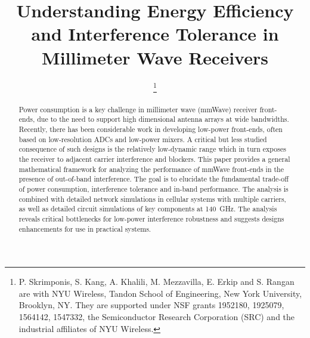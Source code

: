 \documentclass[conference]{IEEEtran}
\begin{document}
\title{Understanding Energy Efficiency and 
Interference Tolerance 
in Millimeter Wave Receivers}



\author{
    
    
    
    \thanks{P. Skrimponis, S. Kang, A. Khalili, M. Mezzavilla, E. Erkip and S. Rangan are with NYU Wireless, Tandon School of Engineering, New York University, Brooklyn, NY.
    They are supported under
    NSF grants 1952180, 1925079, 1564142, 
    1547332, the Semiconductor Research Corporation (SRC) and the industrial affiliates
    of NYU Wireless.
    }
    

}
\IEEEoverridecommandlockouts

\maketitle

\begin{abstract}
Power consumption is a key challenge
in millimeter wave (mmWave) receiver front-ends,
due to the need to support high dimensional antenna arrays
at wide bandwidths.  
Recently, there has been considerable work in developing 
low-power front-ends, often based on low-resolution ADCs
and low-power mixers.
A critical but less studied consequence of such designs is the
relatively low-dynamic range which in turn exposes the receiver 
to adjacent carrier interference and blockers.
This paper provides a general mathematical framework for 
analyzing the performance of mmWave front-ends
in the presence of out-of-band interference.
The goal is to elucidate the
 fundamental trade-off of power consumption, interference
tolerance and in-band performance.  
The analysis is combined with detailed network simulations
in cellular systems with multiple carriers, as well as detailed circuit
simulations of key components at \SI{140}{GHz}.  The analysis
reveals critical bottlenecks for low-power interference robustness
and suggests designs enhancements  for use in
practical systems.
\end{abstract}







% 
% 




\end{document}
